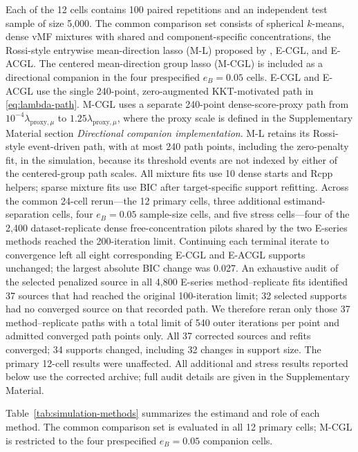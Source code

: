 \documentclass[preprint,12pt,authoryear]{elsarticle}
\begin{document}
Each of the 12 cells contains 100 paired repetitions and an independent test
sample of size 5,000. The common comparison set consists of spherical
$k$-means, dense vMF mixtures with shared and component-specific
concentrations, the Rossi-style entrywise mean-direction lasso (M-L) proposed
by \citet{rossi2022sparsevmf}, E-CGL, and E-ACGL. The centered
mean-direction group lasso (M-CGL) is included as a
directional companion in the four prespecified
$e_B=0.05$ cells. E-CGL and E-ACGL use the single 240-point,
zero-augmented KKT-motivated path in \eqref{eq:lambda-path}. M-CGL uses a separate
240-point dense-score-proxy path from
$10^{-4}\lambda_{\mathrm{proxy},\mu}$ to
$1.25\lambda_{\mathrm{proxy},\mu}$, where the proxy scale is defined in
the Supplementary Material section \emph{Directional companion implementation}.
M-L retains its Rossi-style event-driven path, with
at most 240 path points, including the zero-penalty fit, in the simulation,
because its threshold events are not indexed by either of the centered-group
path scales.
All mixture fits use 10 dense starts and Rcpp helpers; sparse mixture fits use
BIC after target-specific support refitting.
Across the common 24-cell rerun---the 12 primary cells, three additional
estimand-separation cells, four $e_B=0.05$ sample-size cells, and five stress
cells---four of the 2,400 dataset-replicate dense
free-concentration pilots shared by the two E-series methods reached the
200-iteration limit. Continuing each terminal iterate to convergence left all eight
corresponding E-CGL and E-ACGL supports unchanged; the largest absolute BIC
change was 0.027.
An exhaustive audit of the selected penalized source in all 4,800 E-series
method--replicate fits identified 37 sources that had reached the original
100-iteration limit; 32 selected supports had no converged source on that
recorded path. We therefore reran only those 37 method--replicate paths with a
total limit of 540 outer iterations per point and admitted converged path
points only. All 37 corrected
sources and refits converged; 34 supports changed, including 32 changes in
support size. The primary 12-cell results were unaffected. All additional
and stress results reported below use the corrected archive; full audit
details are given in the Supplementary Material.

Table~\ref{tab:simulation-methods} summarizes the estimand and role of each
method. The common comparison set is evaluated in all 12 primary cells;
M-CGL is restricted to the four prespecified $e_B=0.05$ companion cells.
\end{document}
